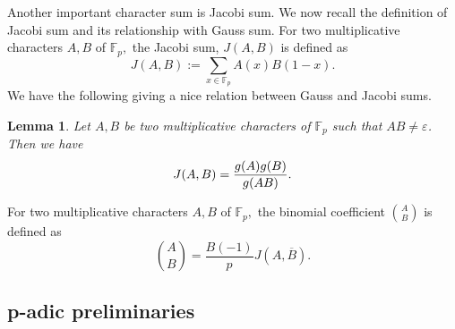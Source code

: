 \documentclass[12pt]{amsart}
\theoremstyle{plain}
\newtheorem{lemma}[theorem]{Lemma}
\theoremstyle{definition}
\theoremstyle{remark}
\newcommand{\F}{\mathbb{F}}
\numberwithin{equation}{section}
\begin{document}
Another important character sum is Jacobi sum. We now recall the definition of Jacobi sum and its relationship with Gauss sum. For two multiplicative characters $A,B$ of $\F_p,$ the Jacobi sum, $J(A,B)$ is defined as 
$$
J(A,B):=\sum\limits_{x\in\F_p}A(x) B(1-x).
$$
We have the following giving a nice relation between Gauss and Jacobi sums. 
\begin{lemma}\cite{greene}\label{gauss jacobi relation} Let $A,B$ be two multiplicative characters of $\mathbb{F}_p$ such that $AB\neq \varepsilon$. Then we have 
\begin{align}
J(A, B)=\frac{g(A)g(B)}{g(AB)}.\notag
\end{align}
\end{lemma} 

For two multiplicative characters $A,B$ of $\F_p,$ the binomial coefficient ${A\choose B}$ is defined as $${A\choose B}=\frac{B(-1)}{p}J(A, \overline{B}).$$




\subsection{p-adic preliminaries}
\end{document}
